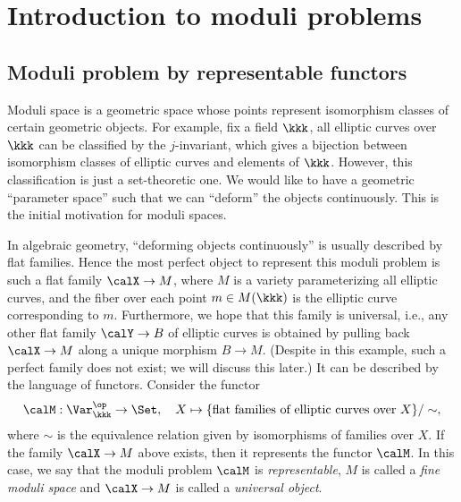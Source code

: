\section{Introduction to moduli problems}


\subsection{Moduli problem by representable functors}
    
    Moduli space is a geometric space whose points represent isomorphism classes of certain geometric objects.
    For example, fix a field \(\kkk\), all elliptic curves over \(\kkk\) can be classified by the \(j\)-invariant, which gives a bijection between isomorphism classes of elliptic curves and elements of \(\kkk\).
    However, this classification is just a set-theoretic one.
    We would like to have a geometric ``parameter space'' such that we can ``deform'' the objects continuously.
    This is the initial motivation for moduli spaces.

    In algebraic geometry, ``deforming objects continuously'' is usually described by flat families.
    Hence the most perfect object to represent this moduli problem is such a flat family \(\calX \to M\), where \(M\) is a variety parameterizing all elliptic curves, and the fiber over each point \(m \in M(\kkk)\) is the elliptic curve corresponding to \(m\).
    Furthermore, we hope that this family is universal, i.e., any other flat family \(\calY \to B\) of elliptic curves is obtained by pulling back \(\calX \to M\) along a unique morphism \(B \to M\).
    (Despite in this example, such a perfect family does not exist; we will discuss this later.)
    It can be described by the language of functors.
    Consider the functor
    \[ \calM: \Var_{\kkk}^{\op} \to \Set,\quad X \mapsto \{\text{flat families of elliptic curves over } X\}/\sim, \]
    where \(\sim\) is the equivalence relation given by isomorphisms of families over \(X\).
    If the family \(\calX \to M\) above exists, then it represents the functor \(\calM\).
    In this case, we say that the moduli problem \(\calM\) is \emph{representable}, \(M\) is called a \emph{fine moduli space} and \(\calX \to M\) is called a \emph{universal object}.


    

